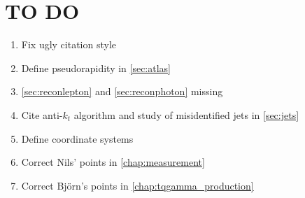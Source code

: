 \chapter{TO DO}
\begin{enumerate}
    \item Fix ugly citation style
    \item Define pseudorapidity in \ref{sec:atlas}
    \item \ref{sec:reconlepton} and \ref{sec:reconphoton} missing
    \item Cite anti-$k_t$ algorithm and study of misidentified jets in \ref{sec:jets}
    \item Define coordinate systems
    \item Correct Nils' points in \ref{chap:measurement}
    \item Correct Björn's points in \ref{chap:tqgamma_production}
\end{enumerate}